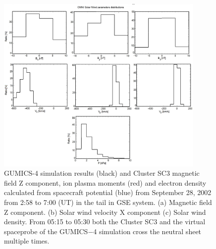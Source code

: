 \documentclass[linenumbers,draft]{agujournal}
\begin{document}
\begin{figure}[h]
\centering
\includegraphics[width=0.9\textwidth,angle=0]{swe-2020-corr-f19}  
\caption{GUMICS-4 simulation results (black) and Cluster SC3 magnetic field Z component, ion plasma moments (red) and electron density calculated from spacecraft potential (blue) from September 28, 2002 from 2:58 to 7:00 (UT) in the tail in GSE system. (a) Magnetic field Z component. (b) Solar wind velocity X component (c) Solar wind density. From 05:15 to 05:30 both the Cluster SC3 and the virtual spaceprobe of the GUMICS$-$4 simulation cross the neutral sheet multiple times.}
\label{fig:nsplot}
\end{figure}

\pagebreak



\pagebreak
\end{document}
